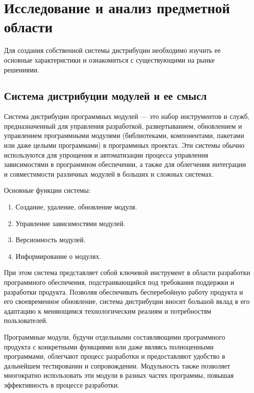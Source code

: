 \chapter{Исследование и анализ предметной области}
\label{cha:analysis}
%
%
Для создания собственной системы дистрибуции необходимо изучить ее основные характеристики и ознакомиться с существующими на рынке решениями.

\section{Система дистрибуции модулей и ее смысл}

Система дистрибуции программных модулей — это набор инструментов и служб, предназначенный для управления разработкой, развертыванием, обновлением и управлением программными модулями (библиотеками, компонентами, пакетами или даже целыми программами) в программных проектах. Эти системы обычно используются для упрощения и автоматизации процесса управления зависимостями в программном обеспечении, а также для облегчения интеграции и совместимости различных модулей в больших и сложных системах.

Основные функции системы:

\begin{enumerate}
\item Создание, удаление, обновление модуля.
\item Управление зависимостями модулей.
\item Версионность модулей.
\item Информирование о модулях.
\end{enumerate}

При этом система представляет собой ключевой инструмент в области разработки программного обеспечения, подстраивающийся под требования поддержки и разработки продукта. Позволяя обеспечивать бесперебойную работу продукта и его своевременное обновление, система дистрибуции вносит большой вклад в его адаптацию к меняющимся технологическим реалиям и потребностям пользователей.

Программные модули, будучи отдельными составляющими программного продукта с конкретными функциями или даже являясь полноценными программами, облегчают процесс разработки и предоставляют удобство в дальнейшем тестировании и сопровождении. Модульность также позволяет многократно использовать эти модули в разных частях программы, повышая эффективность в процессе разработки.

